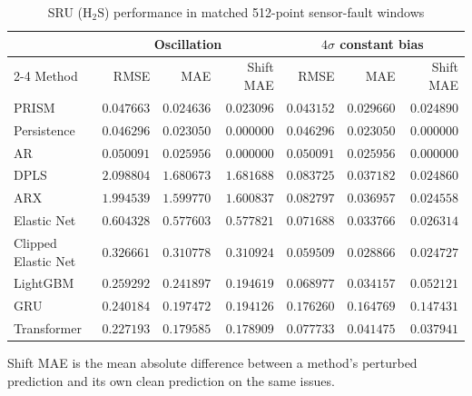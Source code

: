 \begin{table}[!t]
\centering
\caption{SRU ($\mathrm{H_2S}$) performance in matched 512-point sensor-fault windows}
\label{tab:fault-h2s}
\small
\begin{tabular}{lrrrrrr}
\hline
 & \multicolumn{3}{c}{Oscillation} & \multicolumn{3}{c}{$4\sigma$ constant bias} \\
\cline{2-4}\cline{5-7}
Method & RMSE & MAE & Shift MAE & RMSE & MAE & Shift MAE \\
\hline
PRISM & \(0.047663\) & \(0.024636\) & \(0.023096\) & \(0.043152\) & \(0.029660\) & \(0.024890\) \\
Persistence & \(0.046296\) & \(0.023050\) & \(0.000000\) & \(0.046296\) & \(0.023050\) & \(0.000000\) \\
AR & \(0.050091\) & \(0.025956\) & \(0.000000\) & \(0.050091\) & \(0.025956\) & \(0.000000\) \\
DPLS & \(2.098804\) & \(1.680673\) & \(1.681688\) & \(0.083725\) & \(0.037182\) & \(0.024860\) \\
ARX & \(1.994539\) & \(1.599770\) & \(1.600837\) & \(0.082797\) & \(0.036957\) & \(0.024558\) \\
Elastic Net & \(0.604328\) & \(0.577603\) & \(0.577821\) & \(0.071688\) & \(0.033766\) & \(0.026314\) \\
Clipped Elastic Net & \(0.326661\) & \(0.310778\) & \(0.310924\) & \(0.059509\) & \(0.028866\) & \(0.024727\) \\
LightGBM & \(0.259292\) & \(0.241897\) & \(0.194619\) & \(0.068977\) & \(0.034157\) & \(0.052121\) \\
GRU & \(0.240184\) & \(0.197472\) & \(0.194126\) & \(0.176260\) & \(0.164769\) & \(0.147431\) \\
Transformer & \(0.227193\) & \(0.179585\) & \(0.178909\) & \(0.077733\) & \(0.041475\) & \(0.037941\) \\
\hline
\end{tabular}
\par\smallskip
\parbox{0.96\textwidth}{\footnotesize Shift MAE is the mean absolute difference between a method's perturbed prediction and its own clean prediction on the same issues.}
\end{table}

